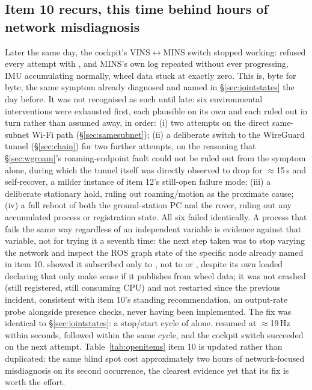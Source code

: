 \subsection{Item 10 recurs, this time behind hours of network misdiagnosis}
\label{sec:july22network}
Later the same day, the cockpit's VINS$\leftrightarrow$MINS switch stopped
working:  refused every attempt with , and MINS's own log repeated
without ever progressing, IMU accumulating normally, wheel data stuck at
exactly zero. This is, byte for byte, the same symptom already diagnosed and
named in \S\ref{sec:jointstates} the day before. It was not recognised as
such until late: six environmental interventions were exhausted first, each
plausible on its own and each ruled out in turn rather than assumed away, in
order: (i) two attempts on the direct same-subnet Wi-Fi path
(\S\ref{sec:samesubnet}); (ii) a deliberate switch to the WireGuard tunnel
(\S\ref{sec:chain}) for two further attempts, on the reasoning that
\S\ref{sec:wgroam}'s roaming-endpoint fault could not be ruled out from the
symptom alone, during which the tunnel itself was directly observed to drop
for $\approx$15\,s and self-recover, a milder instance of item 12's still-open
failure mode; (iii) a deliberate stationary hold, ruling out roaming/motion
as the proximate cause; (iv) a full reboot of both the ground-station PC and
the rover, ruling out any accumulated process or registration state. All six
failed identically. A process that fails the same way regardless of an
independent variable is evidence against that variable, not for trying it a
seventh time: the next step taken was to stop varying the network and
inspect the ROS graph state of the specific node already named in item 10.
 showed it subscribed only
to , not to  or
, despite its own loaded
 declaring 
that only make sense if it publishes  from wheel data;
it was not crashed (still registered, still consuming CPU) and not
restarted since the previous incident, consistent with item 10's standing
recommendation, an output-rate probe alongside presence checks, never having
been implemented. The fix was identical to \S\ref{sec:jointstates}: a
 stop/start cycle of  alone.
 resumed at $\approx$19\,Hz within seconds,
 followed within the same cycle, and the
cockpit switch succeeded on the next attempt. Table~\ref{tab:openitems}
item 10 is updated rather than duplicated: the same blind spot cost
approximately two hours of network-focused misdiagnosis on its second
occurrence, the clearest evidence yet that its fix is worth the effort.

